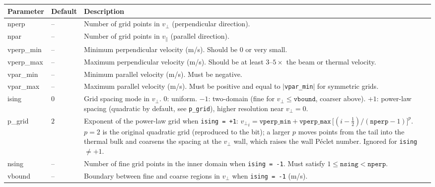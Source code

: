 \documentclass[11pt,a4paper]{article}
\newcommand{\vp}{v_\perp}
\newcommand{\vpa}{v_\parallel}
\begin{document}
\begin{longtable}{>{\ttfamily}p{3.2cm} p{1.5cm} p{9cm}}
\toprule
\normalfont Parameter & Default & Description \\
\midrule
\endhead
\bottomrule
\endlastfoot

nperp & -- &
  Number of grid points in $\vp$ (perpendicular direction). \\[4pt]

npar & -- &
  Number of grid points in $\vpa$ (parallel direction). \\[4pt]

vperp\_min & -- &
  Minimum perpendicular velocity (m/s).  Should be 0 or very small. \\[4pt]

vperp\_max & -- &
  Maximum perpendicular velocity (m/s).  Should be at least $3$--$5\times$
  the beam or thermal velocity. \\[4pt]

vpar\_min & -- &
  Minimum parallel velocity (m/s).  Must be negative. \\[4pt]

vpar\_max & -- &
  Maximum parallel velocity (m/s).  Must be positive and equal to
  $|$\texttt{vpar\_min}$|$ for symmetric grids. \\[4pt]

ising & $0$ &
  Grid spacing mode in $\vp$.
  $0$: uniform.
  $-1$: two-domain (fine for $\vp \le \texttt{vbound}$, coarser above).
  $+1$: power-law spacing (quadratic by default, see \texttt{p\_grid}), higher
  resolution near $\vp = 0$. \\[4pt]

p\_grid & $2$ &
  Exponent of the power-law grid when \texttt{ising = +1}:
  ${\vp}_i = \texttt{vperp\_min} + \texttt{vperp\_max}\,
  \bigl[(i-\tfrac12)/(\texttt{nperp}-1)\bigr]^{p}$.
  $p = 2$ is the original quadratic grid (reproduced to the bit); a larger
  $p$ moves points from the tail into the thermal bulk and coarsens the
  spacing at the $\vp$ wall, which raises the wall P\'eclet number.
  Ignored for \texttt{ising} $\ne +1$. \\[4pt]

nsing & -- &
  Number of fine grid points in the inner domain when \texttt{ising = -1}.
  Must satisfy $1 \le \texttt{nsing} < \texttt{nperp}$. \\[4pt]

vbound & -- &
  Boundary between fine and coarse regions in $\vp$ when \texttt{ising = -1}
  (m/s). \\[4pt]

\end{longtable}
\end{document}
